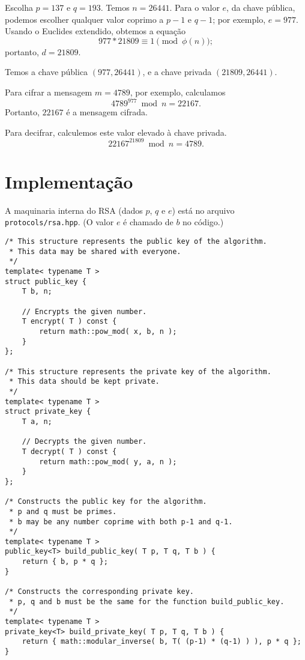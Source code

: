 \documentclass{article}
\begin{document}
Escolha $p = 137$ e $q = 193$.
Temos $n = 26441$.
Para o valor $e$, da chave pública,
podemos escolher qualquer valor coprimo a $p-1$ e $q-1$;
por exemplo, $e = 977$.
Usando o Euclides extendido,
obtemos a equação
\begin{equation*}
    977 * 21809 \equiv 1 \pmod{\phi(n)};
\end{equation*}
portanto, $d = 21809$.

Temos a chave pública $(977, 26441)$, e a chave privada $(21809, 26441)$.

Para cifrar a mensagem $m = 4789$, por exemplo,
calculamos
\begin{equation*}
    4789 ^ {977} \bmod n = 22167.
\end{equation*}
Portanto, $22167$ é a mensagem cifrada.

Para decifrar, calculemos este valor elevado à chave privada.
\begin{equation*}
    22167 ^ {21809} \bmod n = 4789.
\end{equation*}

\section{Implementação}

A maquinaria interna do RSA (dados $p$, $q$ e $e$)
está no arquivo \verb"protocols/rsa.hpp".
(O valor $e$ é chamado de $b$ no código.)

\begin{verbatim}
/* This structure represents the public key of the algorithm.
 * This data may be shared with everyone.
 */
template< typename T >
struct public_key {
    T b, n;

    // Encrypts the given number.
    T encrypt( T ) const {
        return math::pow_mod( x, b, n );
    }
};

/* This structure represents the private key of the algorithm.
 * This data should be kept private.
 */
template< typename T >
struct private_key {
    T a, n;

    // Decrypts the given number.
    T decrypt( T ) const {
        return math::pow_mod( y, a, n );
    }
};

/* Constructs the public key for the algorithm.
 * p and q must be primes.
 * b may be any number coprime with both p-1 and q-1.
 */
template< typename T >
public_key<T> build_public_key( T p, T q, T b ) {
    return { b, p * q };
}

/* Constructs the corresponding private key.
 * p, q and b must be the same for the function build_public_key.
 */
template< typename T >
private_key<T> build_private_key( T p, T q, T b ) {
    return { math::modular_inverse( b, T( (p-1) * (q-1) ) ), p * q };
}
\end{verbatim}
\end{document}
